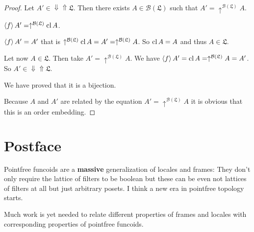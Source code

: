 \begin{proof}
  Let $A' \in \Downarrow \Uparrow \mathfrak{L}$. Then there exists $A \in
  \mathcal{B} (\mathfrak{L})$ such that $A' = \uparrow^{\mathcal{B}
  (\mathfrak{L})} A$.
  
  $\left\langle f\right\rangle A' = \uparrow^{\mathcal{B} (\mathfrak{L})} \operatorname{cl} A$.
  
  $\left\langle f\right\rangle A' = A'$ that is $\uparrow^{\mathcal{B} (\mathfrak{L})}
  \operatorname{cl} A = A' = \uparrow^{\mathcal{B} (\mathfrak{L})} A$. So $\operatorname{cl} A
  = A$ and thus $A \in \mathfrak{L}$.
  
  Let now $A \in \mathfrak{L}$. Then take $A' = \uparrow^{\mathcal{B}
  (\mathfrak{L})} A$. We have $\left\langle f\right\rangle A' = \operatorname{cl} A =
  \uparrow^{\mathcal{B} (\mathfrak{L})} A = A'$. So $A' \in \Downarrow
  \Uparrow \mathfrak{L}$.
  
  We have proved that it is a bijection.
  
  Because $A$ and $A'$ are related by the equation $A' = \uparrow^{\mathcal{B}
  (\mathfrak{L})} A$ it is obvious that this is an order embedding.
\end{proof}

\section{Postface}

Pointfree funcoids are a \textbf{massive} generalization of locales and
frames: They don't only require the lattice of filters to be boolean but these
can be even not lattices of filters at all but just arbitrary posets. I think
a new era in pointfree topology starts.

Much work is yet needed to relate different properties of frames and locales
with corresponding properties of pointfree funcoids.